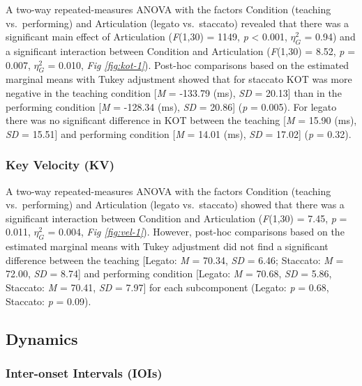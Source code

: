 \documentclass[
  man,floatsintext]{apa6}
\begin{document}
A two-way repeated-measures ANOVA with the factors Condition (teaching vs.~performing) and Articulation (legato vs.~staccato) revealed that there was a significant main effect of Articulation (\emph{F}(1,30) = 1149, \emph{p} \textless{} 0.001, \(\eta_G^2\) = 0.94) and a significant interaction between Condition and Articulation (\emph{F}(1,30) = 8.52, \emph{p} = 0.007, \(\eta_G^2\) = 0.010, \emph{Fig \ref{fig:kot-1}}). Post-hoc comparisons based on the estimated marginal means with Tukey adjustment showed that for staccato KOT was more negative in the teaching condition {[}\emph{M} = -133.79 (ms), \emph{SD} = 20.13{]} than in the performing condition {[}\emph{M} = -128.34 (ms), \emph{SD} = 20.86{]} (\emph{p} = 0.005). For legato there was no significant difference in KOT between the teaching {[}\emph{M} = 15.90 (ms), \emph{SD} = 15.51{]} and performing condition {[}\emph{M} = 14.01 (ms), \emph{SD} = 17.02{]} (\emph{p} = 0.32).

\hypertarget{key-velocity-kv}{%
\subsubsection{Key Velocity (KV)}\label{key-velocity-kv}}

A two-way repeated-measures ANOVA with the factors Condition (teaching vs.~performing) and Articulation (legato vs.~staccato) showed that there was a significant interaction between Condition and Articulation (\emph{F}(1,30) = 7.45, \emph{p} = 0.011, \(\eta_G^2\) = 0.004, \emph{Fig \ref{fig:vel-1}}). However, post-hoc comparisons based on the estimated marginal means with Tukey adjustment did not find a significant difference between the teaching {[}Legato: \emph{M} = 70.34, \emph{SD} = 6.46; Staccato: \emph{M} = 72.00, \emph{SD} = 8.74{]} and performing condition {[}Legato: \emph{M} = 70.68, \emph{SD} = 5.86, Staccato: \emph{M} = 70.41, \emph{SD} = 7.97{]} for each subcomponent (Legato: \emph{p} = 0.68, Staccato: \emph{p} = 0.09).

\hypertarget{dynamics}{%
\subsection{Dynamics}\label{dynamics}}

\hypertarget{inter-onset-intervals-iois-1}{%
\subsubsection{Inter-onset Intervals (IOIs)}\label{inter-onset-intervals-iois-1}}
\end{document}
